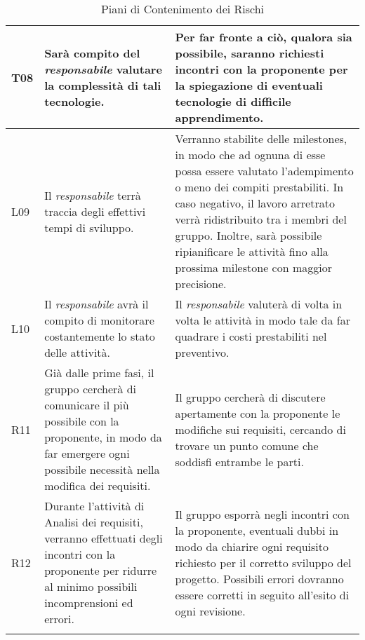 \begin{longtable}{|C{.11\textwidth}|C{.40\textwidth}|C{.40\textwidth}|}
T08 & Sarà compito del \textit{responsabile} valutare la complessità di tali tecnologie. & Per far fronte a ciò, qualora sia possibile, saranno richiesti incontri con la proponente per la spiegazione di eventuali tecnologie di difficile apprendimento.\\
\hline
L09 & Il \textit{responsabile} terrà traccia degli effettivi tempi di sviluppo. & Verranno stabilite delle milestones, in modo che ad ognuna di esse possa essere valutato l'adempimento o meno dei compiti prestabiliti. In caso negativo, il lavoro arretrato verrà ridistribuito tra i membri del gruppo. Inoltre, sarà possibile ripianificare le attività fino alla prossima milestone con maggior precisione. \\
\hline
{}L10 & Il \textit{responsabile} avrà il compito di monitorare costantemente lo stato delle attività. & Il \textit{responsabile} valuterà di volta in volta le attività in modo tale da far quadrare i costi prestabiliti nel preventivo.\\
\hline
R11 & Già dalle prime fasi, il gruppo cercherà di comunicare il più possibile con la proponente, in modo da far emergere ogni possibile necessità nella modifica dei requisiti. & Il gruppo cercherà di discutere apertamente con la proponente le modifiche sui requisiti, cercando di trovare un punto comune che soddisfi entrambe le parti. \\
\hline
{}R12 & Durante l'attività di Analisi dei requisiti, verranno effettuati degli incontri con la proponente per ridurre al minimo possibili incomprensioni ed errori.  & Il gruppo esporrà negli incontri con la proponente, eventuali dubbi in modo da chiarire ogni requisito richiesto per il corretto sviluppo del progetto. Possibili errori dovranno essere corretti in seguito all'esito di ogni revisione.\\
\hline
\caption{Piani di Contenimento dei Rischi
\label{table:Contenimento Rischi}}
\end{longtable}
